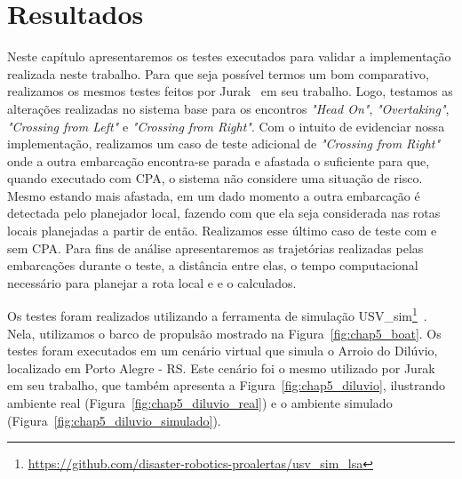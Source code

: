 \chapter{Resultados}\label{chap5:resultados}
    Neste capítulo apresentaremos os testes executados para validar a implementação realizada neste trabalho. Para que seja possível termos um bom comparativo, realizamos os mesmos testes feitos por Jurak~\cite{Jurak2020COLREGS} em seu trabalho. Logo, testamos as alterações realizadas no sistema base para os encontros \textit{"Head On"}, \textit{"Overtaking"}, \textit{"Crossing from Left"} e \textit{"Crossing from Right"}. Com o intuito de evidenciar nossa implementação, realizamos um caso de teste adicional de \textit{"Crossing from Right"} onde a outra embarcação encontra-se parada e afastada o suficiente para que, quando executado com CPA, o sistema não considere uma situação de risco. Mesmo estando mais afastada, em um dado momento a outra embarcação é detectada pelo planejador local, fazendo com que ela seja considerada nas rotas locais planejadas a partir de então. Realizamos esse último caso de teste com e sem CPA. Para fins de análise apresentaremos as trajetórias realizadas pelas embarcações durante o teste, a distância entre elas, o tempo computacional necessário para planejar a rota local e \tcpa e o \dcpa calculados.
    
    Os testes foram realizados utilizando a ferramenta de simulação USV\_sim\footnote{\url{https://github.com/disaster-robotics-proalertas/usv_sim_lsa}}~\cite{Paravisi2018Toward}. Nela, utilizamos o barco de propulsão mostrado na Figura~\ref{fig:chap5_boat}. Os testes foram executados em um cenário virtual que simula o Arroio do Dilúvio, localizado em Porto Alegre - RS. Este cenário foi o mesmo utilizado por Jurak~\cite{Jurak2020COLREGS} em seu trabalho, que também apresenta a Figura~\ref{fig:chap5_diluvio}, ilustrando ambiente real (Figura~\ref{fig:chap5_diluvio_real}) e o ambiente simulado (Figura~\ref{fig:chap5_diluvio_simulado}).
    
